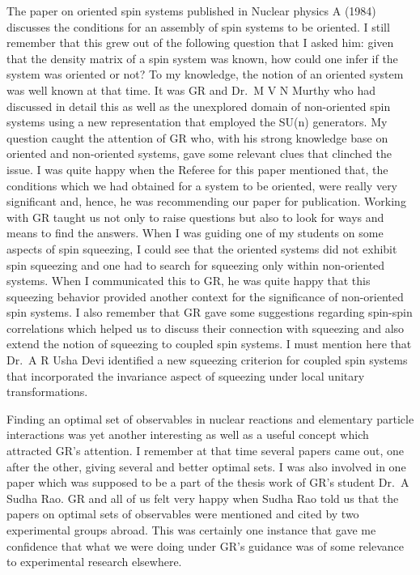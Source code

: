 The paper on oriented spin systems published in Nuclear physics A (1984) discusses the conditions for an assembly of spin systems to be oriented. I still remember that this grew out of the following question that I asked him: given that the density matrix of a spin system was known, how could one infer if the system was oriented or not? To my knowledge, the notion of an oriented system was well known at that time. It was GR and Dr.\ M V N Murthy who had discussed in detail this as well as the unexplored domain of non-oriented spin systems using a new representation that employed the SU(n) generators. My question caught the attention of GR who, with his strong knowledge base on oriented and non-oriented systems, gave some relevant clues that clinched the issue. I was quite happy when the Referee for this paper mentioned that, the conditions which we had obtained for a system to be oriented, were really very significant and, hence, he was recommending our paper for publication. Working with GR taught us not only to raise questions but also to look for ways and means to find the answers. When I was guiding one of my students on some aspects of spin squeezing, I could see that the oriented systems did not exhibit spin squeezing and one had to search for squeezing only within non-oriented systems. When I communicated this to GR, he was quite happy that this squeezing behavior provided another context for the significance of non-oriented spin systems. I also remember that GR gave some suggestions regarding spin-spin correlations which helped us to discuss their connection with squeezing and also extend the notion of squeezing to coupled spin systems. I must mention here that Dr.\ A R Usha Devi identified a new squeezing criterion for coupled spin systems that incorporated the invariance aspect of squeezing under local unitary transformations.

Finding an optimal set of observables in nuclear reactions and elementary particle interactions was yet another interesting as well as a useful concept which attracted GR's attention. I remember at that time several papers came out, one after the other, giving several and better optimal sets. I was also involved in one paper which was supposed to be a part of the thesis work of GR's student Dr.\ A Sudha Rao. GR and all of us felt very happy when Sudha Rao told us that the papers on optimal sets of observables were mentioned and cited by two experimental groups abroad. This was certainly one instance that gave me confidence that what we were doing under GR's guidance was of some relevance to experimental research elsewhere.

